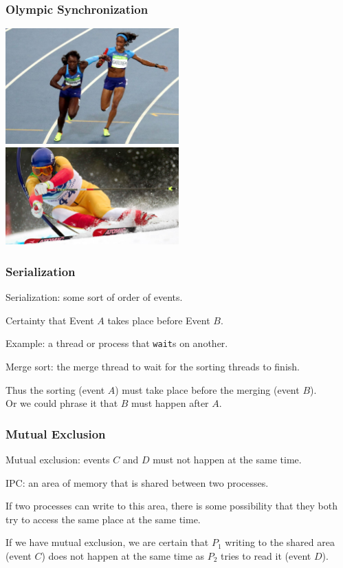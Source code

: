 \begin{frame}
\frametitle{Olympic Synchronization}

\begin{center}
	\includegraphics[width=0.5\textwidth]{images/baton-handoff.jpg}
	\includegraphics[width=0.5\textwidth]{images/skiing.jpg}
\end{center}

\end{frame}


\begin{frame}
\frametitle{Serialization}

\alert{Serialization}: some sort of order of events.

Certainty that Event $A$ takes place before Event $B$. 

Example: a thread or process that \texttt{wait}s on another. 

Merge sort: the merge thread to wait for the sorting threads to finish. 

Thus the sorting (event $A$) must take place before the merging (event $B$).\\
\quad Or we could phrase it that $B$ must happen after $A$.


\end{frame}

\begin{frame}
\frametitle{Mutual Exclusion}

\alert{Mutual exclusion}: events $C$ and $D$ must not happen at the same time. 

IPC: an area of memory that is shared between two processes. 

If two processes can write to this area, there is some possibility that they both try to access the same place at the same time. 

If we have mutual exclusion, we are certain that $P_{1}$ writing to the shared area (event $C$) does not happen at the same time as $P_{2}$ tries to read it (event $D$).

\end{frame}

